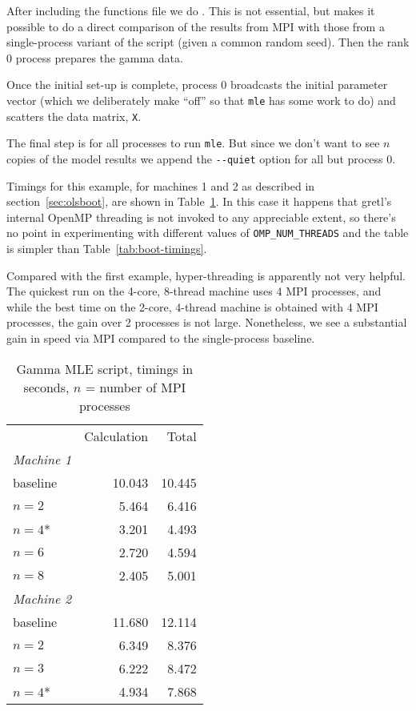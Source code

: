 \documentclass{article}
\begin{document}
After including the functions file we do . This is not essential, but makes it possible to do a direct
comparison of the results from MPI with those from a single-process
variant of the script (given a common random seed). Then the rank 0
process prepares the gamma data.

Once the initial set-up is complete, process 0 broadcasts the initial
parameter vector (which we deliberately make ``off'' so that
\texttt{mle} has some work to do) and scatters the data matrix,
\texttt{X}.

The final step is for all processes to run \texttt{mle}. But since we
don't want to see $n$ copies of the model results we append the
\verb|--quiet| option for all but process 0.

Timings for this example, for machines 1 and 2 as described in
section~\ref{sec:olsboot}, are shown in Table~\ref{tab:mle-timings}.
In this case it happens that gretl's internal \textsf{OpenMP}
threading is not invoked to any appreciable extent, so there's no
point in experimenting with different values of \verb|OMP_NUM_THREADS|
and the table is simpler than Table~\ref{tab:boot-timings}.

Compared with the first example, hyper-threading is apparently not
very helpful. The quickest run on the 4-core, 8-thread machine uses 4
MPI processes, and while the best time on the 2-core, 4-thread machine
is obtained with 4 MPI processes, the gain over 2 processes is not
large. Nonetheless, we see a substantial gain in speed via MPI
compared to the single-process baseline.

\begin{table}[htbp]
\begin{center}
\begin{tabular}{lrr}
         & Calculation & Total \\
\textit{Machine 1} \\[2pt]
\quad baseline & 10.043 & 10.445 \\
\quad $n=2$ & 5.464 & 6.416 \\
\quad $n=4$* & 3.201 & 4.493 \\
\quad $n=6$ & 2.720 & 4.594 \\
\quad $n=8$ & 2.405 & 5.001 \\[2pt]
\textit{Machine 2} \\[2pt]
\quad baseline & 11.680 & 12.114 \\
\quad $n=2$ & 6.349 & 8.376 \\
\quad $n=3$ & 6.222 & 8.472 \\
\quad $n=4$* & 4.934 & 7.868
\end{tabular}
\end{center}
\caption{Gamma MLE script, timings in seconds, $n$ = number of MPI
  processes}
\label{tab:mle-timings}
\end{table}
\end{document}
